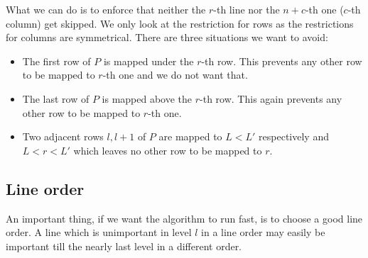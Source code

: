 What we can do is to enforce that neither the $r$-th line nor the $n+c$-th one ($c$-th column) get skipped. We only look at the restriction for rows as the restrictions for columns are symmetrical. There are three situations we want to avoid:
\begin{itemize}
\item The first row of $P$ is mapped under the $r$-th row. This prevents any other row to be mapped to $r$-th one and we do not want that.
\item The last row of $P$ is mapped above the $r$-th row. This again prevents any other row to be mapped to $r$-th one.
\item Two adjacent rows $l,l+1$ of $P$ are mapped to $L<L'$ respectively and $L<r<L'$ which leaves no other row to be mapped to $r$.
\end{itemize}

\subsection{Line order}
\label{sect:order}
An important thing, if we want the algorithm to run fast, is to choose a good line order. A line which is unimportant in level $l$ in a line order may easily be important till the nearly last level in a different order.

